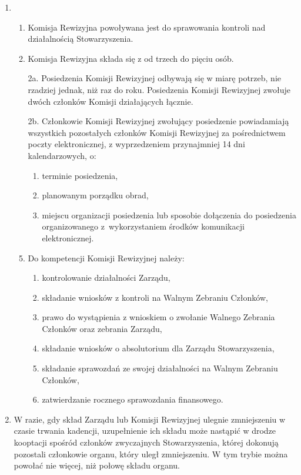 \documentclass[chapterprefix,notitlepage]{article}
\begin{document}
\begin{enumerate}
	\item \begin{enumerate}
		\item Komisja Rewizyjna powoływana jest do sprawowania kontroli nad działalnością Stowarzyszenia.
		\item Komisja Rewizyjna składa się z od trzech do pięciu osób.
		\item[2a.] Posiedzenia Komisji Rewizyjnej odbywają się w miarę potrzeb, nie rzadziej jednak, niż raz do roku. Posiedzenia Komisji Rewizyjnej zwołuje dwóch członków Komisji działających łącznie.
		\item[2b.] Członkowie Komisji Rewizyjnej zwołujący posiedzenie powiadamiają wszystkich pozostałych członków Komisji Rewizyjnej za pośrednictwem poczty elektronicznej, z wyprzedzeniem przynajmniej 14 dni kalendarzowych, o:
		\begin{enumerate}
			\item terminie posiedzenia,
			\item planowanym porządku obrad,
			\item miejscu organizacji posiedzenia lub sposobie dołączenia do posiedzenia organizowanego z~wykorzystaniem środków komunikacji elektronicznej.
		\end{enumerate}
		\item Do kompetencji Komisji Rewizyjnej należy:
		\begin{enumerate}
			\item kontrolowanie działalności Zarządu,
			\item składanie wniosków z kontroli na Walnym Zebraniu Członków,
			\item prawo do wystąpienia z wnioskiem o zwołanie Walnego Zebrania Członków oraz zebrania Zarządu,
			\item składanie wniosków o absolutorium dla Zarządu Stowarzyszenia,
			\item składanie sprawozdań ze swojej działalności na Walnym Zebraniu Członków,
			\item zatwierdzanie rocznego sprawozdania finansowego.
		\end{enumerate}
	\end{enumerate}

	\item W razie, gdy skład Zarządu lub Komisji Rewizyjnej ulegnie zmniejszeniu w czasie trwania kadencji, uzupełnienie ich składu może nastąpić w drodze kooptacji spośród członków zwyczajnych Stowarzyszenia, której dokonują pozostali członkowie organu, który uległ zmniejszeniu. W tym trybie można powołać nie więcej, niż połowę składu organu.



\end{enumerate}
\end{document}
